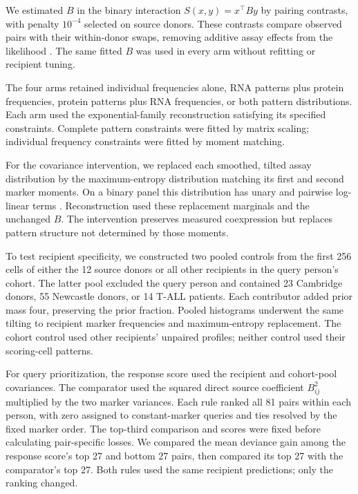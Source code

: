 \documentclass[pdflatex,sn-vancouver-num,iicol]{sn-jnl}
\begin{document}
We estimated $B$ in the binary interaction $S(x,y)=x^\top B y$ by pairing
contrasts, with penalty $10^{-4}$ selected on source donors. These contrasts
compare observed pairs with their within-donor swaps, removing additive assay
effects from the likelihood \cite{sei}. The same fitted $B$ was used in every arm without
refitting or recipient tuning.

The four arms retained individual frequencies alone, RNA patterns plus protein
frequencies, protein patterns plus RNA frequencies, or both pattern
distributions. Each arm used the exponential-family reconstruction satisfying
its specified constraints. Complete pattern constraints were fitted by matrix
scaling; individual frequency constraints were fitted by moment matching.

For the covariance intervention, we replaced each smoothed, tilted assay
distribution by the maximum-entropy distribution matching its first and second
marker moments. On a binary panel this distribution has unary and pairwise
log-linear terms \cite{schneidman}. Reconstruction used these replacement
marginals and the unchanged $B$. The intervention preserves measured
coexpression but replaces pattern structure not determined by those moments.

To test recipient specificity, we constructed two pooled controls from the
first 256 cells of either the 12 source donors or all other recipients in the
query person's cohort. The latter pool excluded the query person and contained
23 Cambridge donors, 55 Newcastle donors, or 14 T-ALL patients. Each contributor
added prior mass four, preserving the prior fraction. Pooled histograms
underwent the same tilting to recipient marker frequencies and maximum-entropy
replacement. The cohort control used other recipients' unpaired profiles;
neither control used their scoring-cell patterns.

For query prioritization, the response score used the recipient and cohort-pool
covariances. The comparator used the squared direct source coefficient
$B_{ij}^2$ multiplied by the two marker variances. Each rule ranked all 81 pairs
within each person, with zero assigned to constant-marker queries and ties
resolved by the fixed marker order. The top-third comparison and scores were fixed before calculating
pair-specific losses. We compared the mean deviance gain among the response
score's top 27 and bottom 27 pairs, then compared its top 27 with the
comparator's top 27. Both rules used the same recipient predictions; only the
ranking changed.
\end{document}
